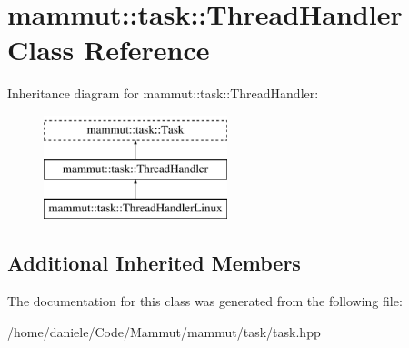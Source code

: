 \hypertarget{classmammut_1_1task_1_1ThreadHandler}{\section{mammut\-:\-:task\-:\-:Thread\-Handler Class Reference}
\label{classmammut_1_1task_1_1ThreadHandler}
}
Inheritance diagram for mammut\-:\-:task\-:\-:Thread\-Handler\-:\begin{figure}[H]
\begin{center}
\leavevmode
\includegraphics[height=3.000000cm]{classmammut_1_1task_1_1ThreadHandler}
\end{center}
\end{figure}
\subsection*{Additional Inherited Members}


The documentation for this class was generated from the following file\-:\begin{DoxyCompactItemize}
\item 
/home/daniele/\-Code/\-Mammut/mammut/task/task.\-hpp\end{DoxyCompactItemize}
